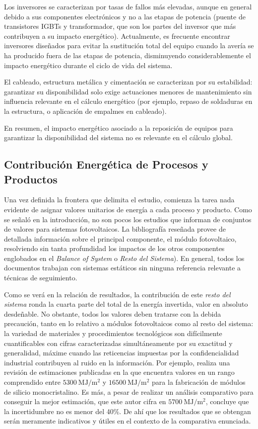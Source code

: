 Los inversores se caracterizan por tasas de fallos más elevadas,
aunque en general debido a sus componentes electrónicos y no a las
etapas de potencia (puente de transistores IGBTs y transformador, que
son los partes del inversor que más contribuyen a su impacto
energético). Actualmente, es frecuente encontrar inversores diseñados
para evitar la sustitución total del equipo cuando la avería se ha
producido fuera de las etapas de potencia, disminuyendo
considerablemente el impacto energético durante el ciclo de vida del
sistema. 

El cableado, estructura metálica y cimentación se caracterizan por su
estabilidad: garantizar su disponibilidad solo exige actuaciones
menores de mantenimiento sin influencia relevante en el cálculo
energético (por ejemplo, repaso de soldaduras en la estructura, o
aplicación de empalmes en cableado). 

En resumen, el impacto energético asociado a la reposición de equipos
para garantizar la disponibilidad del sistema no es relevante en el
cálculo global.

\subsection{Contribución Energética de Procesos y Productos}


Una vez definida la frontera que delimita el estudio, comienza la
tarea nada evidente de asignar valores unitarios de energía a cada
proceso y producto. Como se señaló en la introducción, no son pocos
los estudios que informan de conjuntos de valores para sistemas
fotovoltaicos.  La bibliografía reseñada provee de detallada
información sobre el principal componente, el módulo fotovoltaico,
resolviendo sin tanta profundidad los impactos de los otros
componentes englobados en el \emph{Balance of System} o \emph{Resto
  del Sistema}).  En general, todos los documentos trabajan con
sistemas estáticos sin ninguna referencia relevante a técnicas de
seguimiento.

Como se verá en la relación de resultados, la contribución de este
\emph{resto del sistema} ronda la cuarta parte del total de la energía
invertida, valor en absoluto desdeñable. No obstante, todos los
valores deben tratarse con la debida precaución, tanto en lo relativo
a módulos fotovoltaicos como al resto del sistema: la variedad de
materiales y procedimientos tecnológicos son difícilmente
cuantificables con cifras caracterizadas simultáneamente por su
exactitud y generalidad, máxime cuando las reticencias impuestas por
la confidencialidad industrial contribuyen al ruido en la
información. Por ejemplo, \cite{Alsema2000} realiza una revisión de
estimaciones publicadas en la que encuentra valores en un rango
comprendido entre $\SI{5300}{\mega\joule\per\meter\squared}$ y
$\SI{16500}{\mega\joule\per\meter\squared}$ para la fabricación de
módulos de silicio monocristalino. Es más, a pesar de realizar un
análisis comparativo para conseguir la mejor estimación, que este
autor cifra en $\SI{5700}{\mega\joule\per\meter\squared}$, concluye
que la incertidumbre no es menor del 40\%. De ahí que los resultados
que se obtengan serán meramente indicativos y útiles en el contexto de
la comparativa enunciada.

